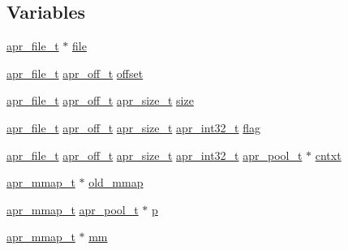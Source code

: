 \subsection*{Variables}
\begin{DoxyCompactItemize}
\item 
\hyperlink{structapr__file__t}{apr\+\_\+file\+\_\+t} $\ast$ \hyperlink{group__apr__mmap_ga4a18bbbd412f9ca4387017cbe38eec30}{file}
\item 
\hyperlink{structapr__file__t}{apr\+\_\+file\+\_\+t} \hyperlink{group__apr__platform_ga6938af9075cec15c88299109381aa984}{apr\+\_\+off\+\_\+t} \hyperlink{group__apr__mmap_ga2cfaefe895be37f478ee9695fd5a7ad6}{offset}
\item 
\hyperlink{structapr__file__t}{apr\+\_\+file\+\_\+t} \hyperlink{group__apr__platform_ga6938af9075cec15c88299109381aa984}{apr\+\_\+off\+\_\+t} \hyperlink{group__apr__platform_gaaa72b2253f6f3032cefea5712a27540e}{apr\+\_\+size\+\_\+t} \hyperlink{group__apr__mmap_gac6148c8bebe750f02794343a9aab1a7b}{size}
\item 
\hyperlink{structapr__file__t}{apr\+\_\+file\+\_\+t} \hyperlink{group__apr__platform_ga6938af9075cec15c88299109381aa984}{apr\+\_\+off\+\_\+t} \hyperlink{group__apr__platform_gaaa72b2253f6f3032cefea5712a27540e}{apr\+\_\+size\+\_\+t} \hyperlink{group__apr__platform_ga21ef1e35fd3ff9be386f3cb20164ff02}{apr\+\_\+int32\+\_\+t} \hyperlink{group__apr__mmap_gac9ec9a6de38e93927dca656ab65d0087}{flag}
\item 
\hyperlink{structapr__file__t}{apr\+\_\+file\+\_\+t} \hyperlink{group__apr__platform_ga6938af9075cec15c88299109381aa984}{apr\+\_\+off\+\_\+t} \hyperlink{group__apr__platform_gaaa72b2253f6f3032cefea5712a27540e}{apr\+\_\+size\+\_\+t} \hyperlink{group__apr__platform_ga21ef1e35fd3ff9be386f3cb20164ff02}{apr\+\_\+int32\+\_\+t} \hyperlink{structapr__pool__t}{apr\+\_\+pool\+\_\+t} $\ast$ \hyperlink{group__apr__mmap_ga3652f9b9de5ead2ce68dfe0b9e09699a}{cntxt}
\item 
\hyperlink{structapr__mmap__t}{apr\+\_\+mmap\+\_\+t} $\ast$ \hyperlink{group__apr__mmap_ga073b4f3dd2880d1ef82fbdaf7c00bfae}{old\+\_\+mmap}
\item 
\hyperlink{structapr__mmap__t}{apr\+\_\+mmap\+\_\+t} \hyperlink{structapr__pool__t}{apr\+\_\+pool\+\_\+t} $\ast$ \hyperlink{group__apr__mmap_ga569b9c1310da94c0e68f530e26ce9cfa}{p}
\item 
\hyperlink{structapr__mmap__t}{apr\+\_\+mmap\+\_\+t} $\ast$ \hyperlink{group__apr__mmap_ga12d9bfb21f432268bf941e8ba2d823a4}{mm}
\end{DoxyCompactItemize}


